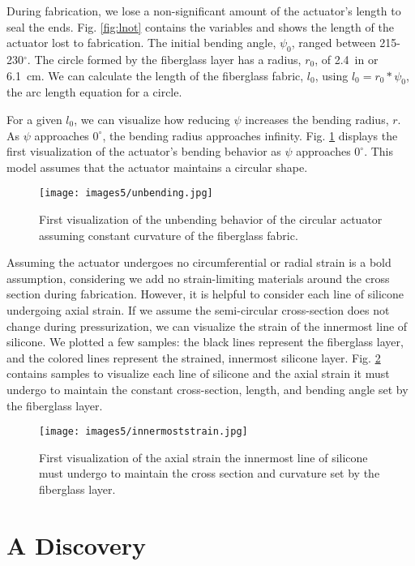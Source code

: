 During fabrication, we lose a non-significant amount of the actuator's length to seal the ends. Fig. \ref{fig:lnot} contains the variables and shows the length of the actuator lost to fabrication. The initial bending angle, $\psi_{0}$, ranged between 215-230$^\circ$. The circle formed by the fiberglass layer has a radius, $r_{0}$, of 2.4~in or 6.1~cm. We can calculate the length of the fiberglass fabric, $l_{0}$, using $l_{0} = r_{0}*\psi_{0}$, the arc length equation for a circle. 

For a given $l_{0}$, we can visualize how reducing $\psi$ increases the bending radius, $r$. As $\psi$ approaches $0^\circ$, the bending radius approaches infinity. Fig. \ref{fig:unbending} displays the first visualization of the actuator's bending behavior as $\psi$ approaches $0^\circ$. This model assumes that the actuator maintains a circular shape. 

\begin{figure}[h]
    \centering
    \texttt{[image: images5/unbending.jpg]}
    \caption{First visualization of the unbending behavior of the circular actuator assuming constant curvature of the fiberglass fabric.}
    \label{fig:unbending}
\end{figure}

Assuming the actuator undergoes no circumferential or radial strain is a bold assumption, considering we add no strain-limiting materials around the cross section during fabrication. However, it is helpful to consider each line of silicone undergoing axial strain. If we assume the semi-circular cross-section does not change during pressurization, we can visualize the strain of the innermost line of silicone. We plotted a few samples: the black lines represent the fiberglass layer, and the colored lines represent the strained, innermost silicone layer. Fig. \ref{fig:innermoststrain} contains samples to visualize each line of silicone and the axial strain it must undergo to maintain the constant cross-section, length, and bending angle set by the fiberglass layer. 

\begin{figure}[h]
    \centering
    \texttt{[image: images5/innermoststrain.jpg]}
    \caption{First visualization of the axial strain the innermost line of silicone must undergo to maintain the cross section and curvature set by the fiberglass layer.}
    \label{fig:innermoststrain}
\end{figure}

\section{A Discovery}

